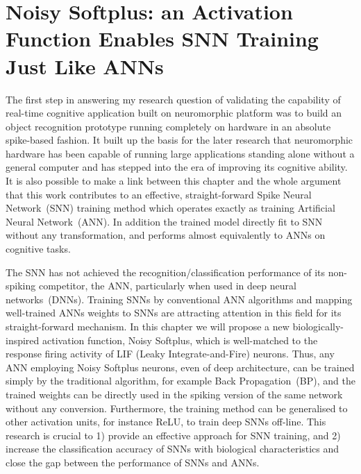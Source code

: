 \chapter{Noisy Softplus: an Activation Function Enables SNN Training Just Like ANNs}
\label{cha:Conv}
The first step in answering my research question of validating the capability of real-time cognitive application built on neuromorphic platform was to build an object recognition prototype running completely on hardware in an absolute spike-based fashion.
It built up the basis for the later research that neuromorphic hardware has been capable of running large applications standing alone without a general computer and has stepped into the era of improving its cognitive ability.
It is also possible to make a link between this chapter and the whole argument that this work contributes to an effective, straight-forward Spike Neural Network~(SNN) training method which operates exactly as training Artificial Neural Network~(ANN).
In addition the trained model directly fit to SNN without any transformation, and performs almost equivalently to ANNs on cognitive tasks.

The SNN has not achieved the recognition/classification performance of its non-spiking competitor, the ANN, particularly when used in deep neural networks~(DNNs).
Training SNNs by conventional ANN algorithms and mapping well-trained ANNs weights to SNNs are attracting attention in this field for its straight-forward mechanism.
In this chapter we will propose a new biologically-inspired activation function, Noisy Softplus, which is well-matched to the response firing activity of LIF (Leaky Integrate-and-Fire) neurons.
Thus, any ANN employing Noisy Softplus neurons, even of deep architecture, can be trained simply by the traditional algorithm, for example Back Propagation~(BP), and the trained weights can be directly used in the spiking version of the same network without any conversion.
Furthermore, the training method can be generalised to other activation units, for instance ReLU, to train deep SNNs off-line.
This research is crucial to 1) provide an effective approach for SNN training, and 2) increase the classification accuracy of SNNs with biological characteristics and close the gap between the performance of SNNs and ANNs.

